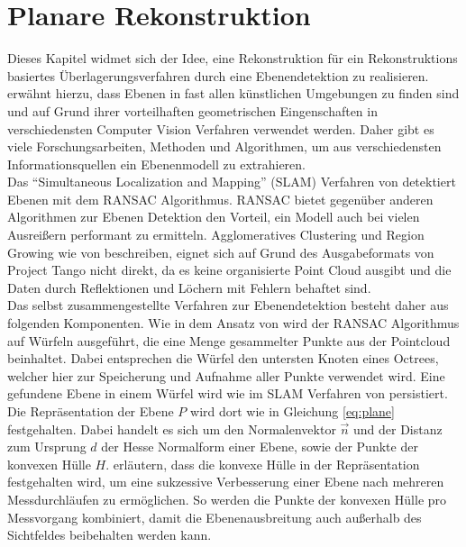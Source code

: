 \section{Planare Rekonstruktion} \label{sec:plane-reconstruction}

Dieses Kapitel widmet sich der Idee, eine Rekonstruktion für ein Rekonstruktions basiertes Überlagerungsverfahren durch eine Ebenendetektion zu realisieren. \citet{yang2010plane} erwähnt hierzu, dass Ebenen in fast allen künstlichen Umgebungen zu finden sind und auf Grund ihrer vorteilhaften geometrischen Eingenschaften in verschiedensten Computer Vision Verfahren verwendet werden. Daher gibt es viele Forschungsarbeiten, Methoden und Algorithmen, um aus verschiedensten Informationsquellen ein Ebenenmodell zu extrahieren.\\

Das \enquote{Simultaneous Localization and Mapping} (SLAM) Verfahren von \citet{trevor2012planar} detektiert Ebenen mit dem RANSAC Algorithmus. RANSAC bietet gegenüber anderen Algorithmen zur Ebenen Detektion den Vorteil, ein Modell auch bei vielen Ausreißern performant zu ermitteln. Agglomeratives Clustering und Region Growing wie von \citet{feng2014fast} beschreiben, eignet sich auf Grund des Ausgabeformats von Project Tango nicht direkt, da es keine organisierte Point Cloud ausgibt und die Daten durch Reflektionen und Löchern mit Fehlern behaftet sind. \\

Das selbst zusammengestellte Verfahren zur Ebenendetektion besteht daher aus folgenden Komponenten. Wie in dem Ansatz von \citet{yang2010plane} wird der RANSAC Algorithmus auf Würfeln ausgeführt, die eine Menge gesammelter Punkte aus der Pointcloud beinhaltet. Dabei entsprechen die Würfel den untersten Knoten eines Octrees, welcher hier zur Speicherung und Aufnahme aller Punkte verwendet wird. Eine gefundene Ebene in einem Würfel wird wie im SLAM Verfahren von \citet{trevor2012planar} persistiert. Die Repräsentation der Ebene \(P\) wird dort wie in Gleichung \ref{eq:plane} festgehalten. Dabei handelt es sich um den Normalenvektor \(\vec{n}\) und der Distanz zum Ursprung \(d\) der Hesse Normalform einer Ebene, sowie der Punkte der konvexen Hülle \(H\). \citet{trevor2012planar} erläutern, dass die konvexe Hülle in der Repräsentation festgehalten wird, um eine sukzessive Verbesserung einer Ebene nach mehreren Messdurchläufen zu ermöglichen. So werden die Punkte der konvexen Hülle pro Messvorgang kombiniert, damit die Ebenenausbreitung auch außerhalb des Sichtfeldes beibehalten werden kann. \\

